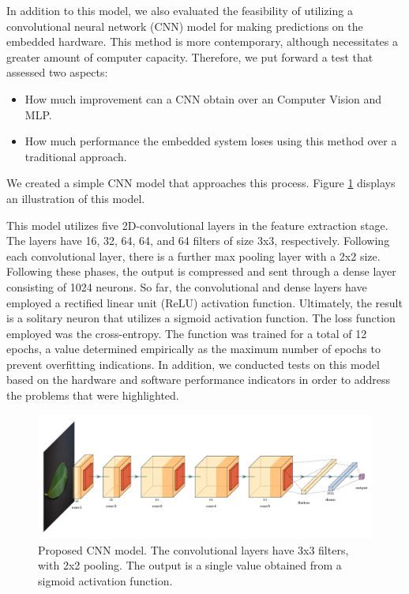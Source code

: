 In addition to this model, we also evaluated the feasibility of utilizing a convolutional neural network (CNN) model for making predictions on the embedded hardware. This method is more contemporary, although necessitates a greater amount of computer capacity. Therefore, we put forward a test that assessed two aspects:


\begin{itemize}
    \item How much improvement can a CNN obtain over an Computer Vision and MLP.
    \item How much performance the embedded system loses using this method over a traditional approach.
\end{itemize}

We created a simple CNN model that approaches this process. Figure \ref{fig:CNN-model} displays an illustration of this model.

This model utilizes five 2D-convolutional layers in the feature extraction stage. The layers have 16, 32, 64, 64, and 64 filters of size 3x3, respectively. Following each convolutional layer, there is a further max pooling layer with a 2x2 size. Following these phases, the output is compressed and sent through a dense layer consisting of 1024 neurons. So far, the convolutional and dense layers have employed a rectified linear unit (ReLU) activation function. Ultimately, the result is a solitary neuron that utilizes a sigmoid activation function. The loss function employed was the cross-entropy. The function was trained for a total of 12 epochs, a value determined empirically as the maximum number of epochs to prevent overfitting indications. In addition, we conducted tests on this model based on the hardware and software performance indicators in order to address the problems that were highlighted.

\begin{figure}[h!]
    \centering
    \includegraphics[width = \linewidth]{Figures/CNN_Sensors.png}
    \caption{Proposed CNN model. The convolutional layers have 3x3 filters, with 2x2 pooling. The output is a single value obtained from a sigmoid activation function.}
    \label{fig:CNN-model}
\end{figure}

